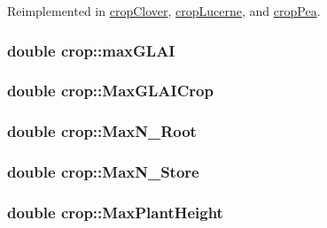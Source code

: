 Reimplemented in \hyperlink{classcrop_clover_a1d9dbe99654e2faa451ab20ff6653683}{cropClover}, \hyperlink{classcrop_lucerne_a1825e7ae2c0a02fa019d85c9df1e994c}{cropLucerne}, and \hyperlink{classcrop_pea_a1852a7eb6965220c3bbd686504a87193}{cropPea}.\hypertarget{classcrop_a7cc6a117013deeda470335c166066615}{
\subsubsection[{maxGLAI}]{\setlength{\rightskip}{0pt plus 5cm}double {\bf crop::maxGLAI}}}
\label{classcrop_a7cc6a117013deeda470335c166066615}
\hypertarget{classcrop_a79905dd2d78bdaafd9569f9ecdd43665}{
\subsubsection[{MaxGLAICrop}]{\setlength{\rightskip}{0pt plus 5cm}double {\bf crop::MaxGLAICrop}}}
\label{classcrop_a79905dd2d78bdaafd9569f9ecdd43665}
\hypertarget{classcrop_a62361ade607f9cc57e226c1134ad0eb2}{
\subsubsection[{MaxN\_\-Root}]{\setlength{\rightskip}{0pt plus 5cm}double {\bf crop::MaxN\_\-Root}}}
\label{classcrop_a62361ade607f9cc57e226c1134ad0eb2}
\hypertarget{classcrop_a9f5ab366fce6f1259588cf5087cdb4c2}{
\subsubsection[{MaxN\_\-Store}]{\setlength{\rightskip}{0pt plus 5cm}double {\bf crop::MaxN\_\-Store}}}
\label{classcrop_a9f5ab366fce6f1259588cf5087cdb4c2}
\hypertarget{classcrop_a211a8242464133985cb2f26964b0f782}{
\subsubsection[{MaxPlantHeight}]{\setlength{\rightskip}{0pt plus 5cm}double {\bf crop::MaxPlantHeight}}}
